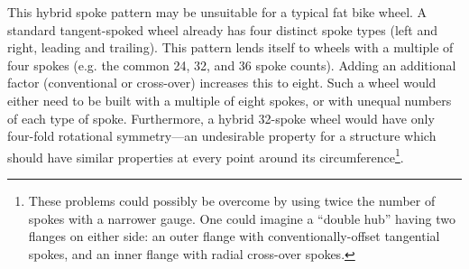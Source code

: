 \documentclass[\rootdir/thesis.tex]{subfiles}
\begin{document}
This hybrid spoke pattern may be unsuitable for a typical fat bike wheel. A standard tangent-spoked wheel already has four distinct spoke types (left and right, leading and trailing). This pattern lends itself to wheels with a multiple of four spokes (e.g. the common 24, 32, and 36 spoke counts). Adding an additional factor (conventional or cross-over) increases this to eight. Such a wheel would either need to be built with a multiple of eight spokes, or with unequal numbers of each type of spoke. Furthermore, a hybrid 32-spoke wheel would have only four-fold rotational symmetry---an undesirable property for a structure which should have similar properties at every point around its circumference\footnote{These problems could possibly be overcome by using twice the number of spokes with a narrower gauge. One could imagine a ``double hub'' having two flanges on either side: an outer flange with conventionally-offset tangential spokes, and an inner flange with radial cross-over spokes.}.
\end{document}
